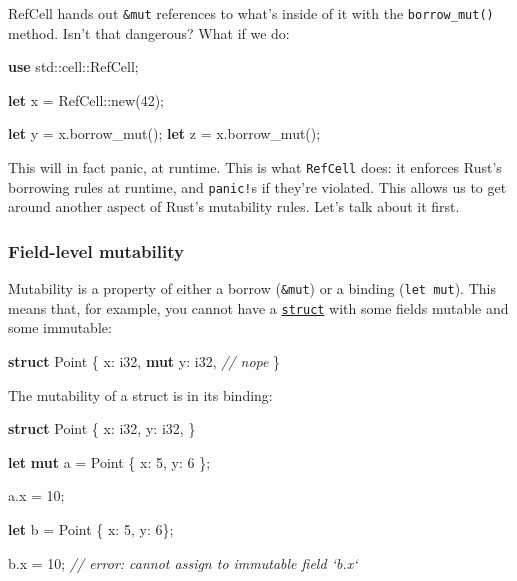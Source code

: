 \documentclass[a4paper,]{book}
\newenvironment{Shaded}{\begin{snugshade}}{\end{snugshade}}
\newcommand{\KeywordTok}[1]{\textcolor[rgb]{0.13,0.29,0.53}{\textbf{{#1}}}}
\newcommand{\DataTypeTok}[1]{\textcolor[rgb]{0.13,0.29,0.53}{{#1}}}
\newcommand{\DecValTok}[1]{\textcolor[rgb]{0.00,0.00,0.81}{{#1}}}
\newcommand{\CommentTok}[1]{\textcolor[rgb]{0.56,0.35,0.01}{\textit{{#1}}}}
\newcommand{\NormalTok}[1]{{#1}}
\begin{document}
RefCell hands out \texttt{\&mut} references to what's inside of it with
the \texttt{borrow\_mut()} method. Isn't that dangerous? What if we do:

\begin{Shaded}
\begin{Highlighting}[]
\KeywordTok{use} \NormalTok{std::cell::RefCell;}

\KeywordTok{let} \NormalTok{x = RefCell::new(}\DecValTok{42}\NormalTok{);}

\KeywordTok{let} \NormalTok{y = x.borrow_mut();}
\KeywordTok{let} \NormalTok{z = x.borrow_mut();}
\end{Highlighting}
\end{Shaded}

This will in fact panic, at runtime. This is what \texttt{RefCell} does:
it enforces Rust's borrowing rules at runtime, and \texttt{panic!}s if
they're violated. This allows us to get around another aspect of Rust's
mutability rules. Let's talk about it first.

\subsubsection{Field-level mutability}\label{field-level-mutability}

Mutability is a property of either a borrow (\texttt{\&mut}) or a
binding (\texttt{let\ mut}). This means that, for example, you cannot
have a \protect\hyperlink{sec--structs}{\texttt{struct}} with some
fields mutable and some immutable:

\begin{Shaded}
\begin{Highlighting}[]
\KeywordTok{struct} \NormalTok{Point \{}
    \NormalTok{x: }\DataTypeTok{i32}\NormalTok{,}
    \KeywordTok{mut} \NormalTok{y: }\DataTypeTok{i32}\NormalTok{, }\CommentTok{// nope}
\NormalTok{\}}
\end{Highlighting}
\end{Shaded}

The mutability of a struct is in its binding:

\begin{Shaded}
\begin{Highlighting}[]
\KeywordTok{struct} \NormalTok{Point \{}
    \NormalTok{x: }\DataTypeTok{i32}\NormalTok{,}
    \NormalTok{y: }\DataTypeTok{i32}\NormalTok{,}
\NormalTok{\}}

\KeywordTok{let} \KeywordTok{mut} \NormalTok{a = Point \{ x: }\DecValTok{5}\NormalTok{, y: }\DecValTok{6} \NormalTok{\};}

\NormalTok{a.x = }\DecValTok{10}\NormalTok{;}

\KeywordTok{let} \NormalTok{b = Point \{ x: }\DecValTok{5}\NormalTok{, y: }\DecValTok{6}\NormalTok{\};}

\NormalTok{b.x = }\DecValTok{10}\NormalTok{; }\CommentTok{// error: cannot assign to immutable field `b.x`}
\end{Highlighting}
\end{Shaded}
\end{document}
